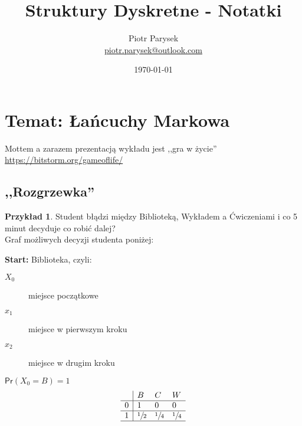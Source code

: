 \documentclass[a4paper,12pt]{article}
\title{Struktury Dyskretne - Notatki}
\author{Piotr Parysek\\
\href{mailto:piotr.parysek@outlook.com}{piotr.parysek@outlook.com} }
\date{\today}
\theoremstyle{definition}%
\newtheorem{example}{Przykład}
\newtheorem*{example*}{Przykład} %
\theoremstyle{definition}
\theoremstyle{problem}
\begin{document}
\maketitle

\tableofcontents
\section[Wykład 7: 20-IV-2017 - Temat: Łańcuchy Markowa]{Temat: Łańcuchy Markowa}
Mottem a zarazem prezentacją wykładu jest ,,gra w życie'' \url{https://bitstorm.org/gameoflife/}

\subsection{,,Rozgrzewka''}
\begin{example*}\label{exa:student}
Student błądzi między Biblioteką, Wykładem a Ćwiczeniami i co 5 minut decyduje co robić dalej?\\
Graf możliwych decyzji studenta poniżej:
\begin{figure}[H]
\centering
{}
\end{figure}
\textbf{Start:} Biblioteka, czyli:
\begin{description}
\item[$X_0$] miejsce początkowe
\item[$x_1$] miejsce w pierwszym kroku
\item[$x_2$] miejsce w drugim kroku
\end{description}
$\mathsf{Pr}(X_0=B)=1$
$$\begin{array}{l|lll}
& B & C & W \\ \hline
0 & 1 & 0 & 0 \\ \hline
1 & \sfrac{1}{2} & \sfrac{1}{4} & \sfrac{1}{4} \\ \hline

\end{array}$$
\end{example*}
\end{document}
